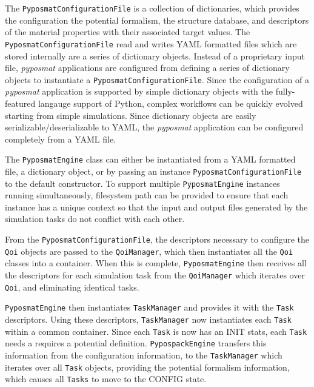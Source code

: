 The \verb|PyposmatConfigurationFile| is a collection of dictionaries, which provides the configuration the potential formalism, the structure database, and descriptors of the material properties with their associated target values.
The \verb|PyposmatConfigurationFile| read and writes YAML formatted files which are stored internally are a series of dictionary objects.
Instead of a proprietary input file, \emph{pyposmat} applications are configured from defining a series of dictionary objects to instantiate a \verb|PyposmatConfigurationFile|.
Since the configuration of a \emph{pyposmat} application is supported by simple dictionary objects with the fully-featured langauge support of Python, complex workflows can be quickly evolved starting from simple simulations.
Since dictionary objects are easily serializable/deserializable to YAML, the \emph{pyposmat} application can be configured completely from a YAML file.

The \verb|PyposmatEngine| class can either be instantiated from a YAML formatted file, a dictionary object, or by passing an instance \verb|PyposmatConfigurationFile| to the default constructor.  To support multiple \verb|PyposmatEngine| instances running simultaneously, filesystem path can be provided to ensure that each instance has a unique context so that the input and output files generated by the simulation tasks do not conflict with each other.

From the \verb|PyposmatConfigurationFile|, the descriptors necessary to configure the \verb|Qoi| objects are passed to the \verb|QoiManager|, which then instantiates all the \verb|Qoi| classes into a container.  When this is complete, \verb|PyposmatEngine| then receives all the descriptors for each simulation task from the \verb|QoiManager| which iterates over \verb|Qoi|, and eliminating identical tasks.

\verb|PyposmatEngine| then instantiates \verb|TaskManager| and provides it with the \verb|Task| descriptors.  Using these descriptors, \verb|TaskManager| now instantiates each \verb|Task| within a common container.  Since each \verb|Task| is now has an INIT stats, each \verb|Task| needs a requires a potential definition.  \verb|PypospackEngine| transfers this information from the configuration information, to the \verb|TaskManager| which iterates over all \verb|Task| objects, providing the potential formalism information, which causes all \verb|Tasks| to move to the CONFIG state.

